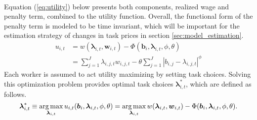 \documentclass[../main.tex]{subfiles}
\begin{document}
\\
Equation (\ref{eq:utility}) below presents both components, realized wage and penalty term, combined to the utility function. Overall, the functional form of the penalty term is modeled to be time invariant, which will be important for the estimation strategy of changes in task prices in section \ref{sec:model_estimation}.
\begin{align}\label{eq:utility}
	u_{i,t} &= w(\boldsymbol{\lambda}_{i,t}, \boldsymbol{w}_{i,t}) - \Phi(\boldsymbol{b}_i, \boldsymbol{\lambda}_{i,t}, \phi, \theta)  \\
	{}		&= \sum^J_{j=1} \lambda_{i,j,t} w_{i,j,t} - \theta \sum^J_{j=1} |b_{i,j} - \lambda_{i,j,t}|^\phi \nonumber
\end{align}
Each worker is assumed to act utility maximizing by setting task choices. Solving this optimization problem provides optimal task choices $\boldsymbol{\lambda}^*_{i, t}$, which are defined as follows.
\begin{equation} \label{eq:optimization_problem}
	\boldsymbol{\lambda}^*_{i, t} \equiv \operatorname*{arg\,max}_{\boldsymbol{\lambda}_{i, t}} u_{i,t}(\boldsymbol{b}_i, \boldsymbol{\lambda}_{i, t}, \phi, \theta) = \operatorname*{arg\,max}_{\boldsymbol{\lambda}_{i, t}} w(\boldsymbol{\lambda}_{i,t}, \boldsymbol{w}_{i,t}) - \Phi(\boldsymbol{b}_i, \boldsymbol{\lambda}_{i,t}, \phi, \theta).
\end{equation}
\end{document}
